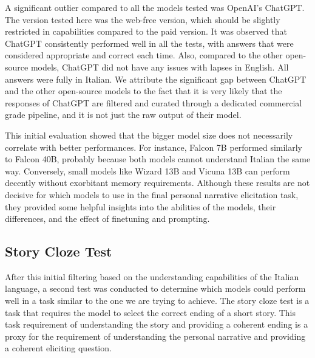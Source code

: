 A significant outlier compared to all the models tested was OpenAI's ChatGPT. The version tested here was the web-free version, which should be slightly restricted in capabilities compared to the paid version. It was observed that ChatGPT consistently performed well in all the tests, with answers that were considered appropriate and correct each time. Also, compared to the other open-source models, ChatGPT did not have any issues with lapses in English. All answers were fully in Italian. We attribute the significant gap between ChatGPT and the other open-source models to the fact that it is very likely that the responses of ChatGPT are filtered and curated through a dedicated commercial grade pipeline, and it is not just the raw output of their model.

This initial evaluation showed that the bigger model size does not necessarily correlate with better performances. For instance, Falcon 7B performed similarly to Falcon 40B, probably because both models cannot understand Italian the same way. Conversely, small models like Wizard 13B and Vicuna 13B can perform decently without exorbitant memory requirements. Although these results are not decisive for which models to use in the final personal narrative elicitation task, they provided some helpful insights into the abilities of the models, their differences, and the effect of finetuning and prompting.

\subsection{Story Cloze Test}
After this initial filtering based on the understanding capabilities of the Italian language, a second test was conducted to determine which models could perform well in a task similar to the one we are trying to achieve. The story cloze test is a task that requires the model to select the correct ending of a short story. This task requirement of understanding the story and providing a coherent ending is a proxy for the requirement of understanding the personal narrative and providing a coherent eliciting question.

